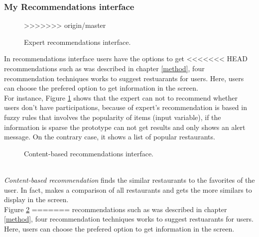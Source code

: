 \subsubsection{My Recommendations interface}
\begin{figure}
\captionsetup{font=footnotesize}
\centering
{}
>>>>>>> origin/master
\caption{Expert recommendations interface.}
\label{fig:expert-recs}   
\end{figure}
In recommendations interface users have the options to get  
<<<<<<< HEAD
recommendations such as was described in chapter  \ref{method}, four 
recommendation techniques works to suggest restuarants for 
users. Here, users can choose the prefered option to get 
information in the screen.\\ 
For instance, Figure  \ref{fig:expert-recs} shows that the expert can 
not to recommend whether users don’t have participations, because of expert's
recommendation is based in fuzzy rules that involves the popularity of
items (input variable), if the information is sparse the prototype can
not get results and only shows an alert message. On the contrary case,
it shows a list of popular restaurants.
\begin{figure}
\captionsetup{font=footnotesize}
\centering
{}
\caption{Content-based recommendations interface.}
\label{fig:base-content}   
\end{figure}
\\ \textit{Content-based recommendation} finds the similar restaurants to the
favorites of the user. In fact, makes a comparison of all restaurants
and gets the more similars to display in the screen. \\
Figure  \ref{fig:base-content}  
=======
recommendations such as was described in chapter \ref{method}, four 
recommendation techniques works to suggest restuarants for 
users. Here, users can choose the prefered option to get 
information in the screen.\\ 

